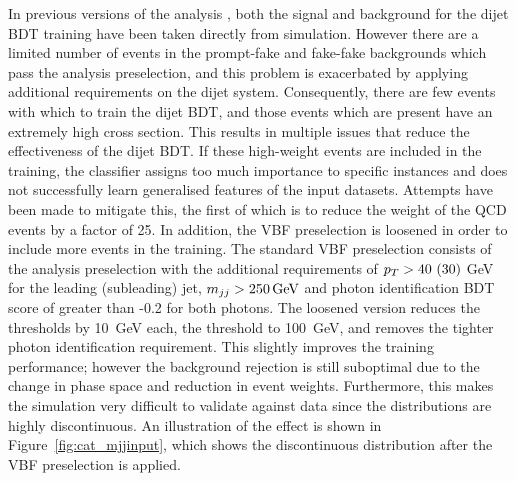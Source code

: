 In previous versions of the analysis \cite{HIG-16-040}, 
both the signal and background for the dijet BDT training have been taken directly from simulation. 
However there are a limited number of events in the prompt-fake and fake-fake backgrounds
which pass the analysis preselection, 
and this problem is exacerbated by applying additional requirements on the dijet system.
Consequently, there are few events with which to train the dijet BDT, 
and those events which are present have an extremely high cross section.
This results in multiple issues that reduce the effectiveness of the dijet BDT.
If these high-weight events are included in the training, 
the classifier assigns too much importance to specific instances 
and does not successfully learn generalised features of the input datasets.
Attempts have been made to mitigate this, 
the first of which is to reduce the weight of the QCD events by a factor of 25.
In addition, the VBF preselection is loosened in 
order to include more events in the training.
The standard VBF preselection consists of the analysis preselection 
with the additional requirements of $p_T > 40~(30)$ GeV for the leading (subleading) jet, 
$m_{jj} > \SI{250}{GeV}$ and photon identification BDT score of greater than -0.2 for both photons.
The loosened version reduces the \pt thresholds by \SI{10}{GeV} each, 
the \mjj threshold to \SI{100}{GeV}, and removes the tighter photon identification requirement.
This slightly improves the training performance; 
however the background rejection is still suboptimal 
due to the change in phase space and reduction in event weights.
Furthermore, this makes the simulation very difficult to validate against data
since the distributions are highly discontinuous.
An illustration of the effect is shown in Figure~\ref{fig:cat_mjjinput}, 
which shows the discontinuous \mjj distribution after the VBF preselection is applied.

